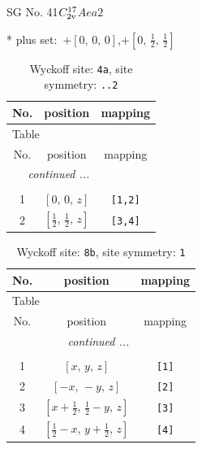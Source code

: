 \documentclass[fleqn,8pt]{jsarticle}
\begin{document}
\setcounter{MaxMatrixCols}{32}

\renewcommand{\tablename}{Table~}
\renewcommand{\figurename}{Figure~}
\begin{center}
\LARGE
SG No. 41\quad$C_{\rm 2v}^{17}$\quad$Aea2$\quad[ orthorhombic ]
\end{center}
* plus set:\,\,\,$+\left[ 0,\, 0,\, 0 \right]$,\quad $+\left[ 0,\, \frac{1}{2},\, \frac{1}{2} \right]$
\renewcommand{\arraystretch}{1.2}
\begin{longtable}{ccc}
\caption{Wyckoff site: {\tt 4a}, site symmetry: {\tt ..2}}
 \\
 \hline \hline
No. & position & mapping \\ \hline \endfirsthead

\multicolumn{2}{l}{\tablename\ \thetable{}} \\
 \hline \hline
No. & position & mapping \\ \hline \endhead

 \hline \hline
\multicolumn{2}{r}{\footnotesize\it continued ...} \\ \endfoot

 \hline \hline
\multicolumn{2}{r}{} \\ \endlastfoot

1 & $\left[ 0,\, 0,\, z \right]$ & {\tt [1,2]} \\ \hline
2 & $\left[ \frac{1}{2},\, \frac{1}{2},\, z \right]$ & {\tt [3,4]} \\
\end{longtable}
\renewcommand{\arraystretch}{1.2}
\begin{longtable}{ccc}
\caption{Wyckoff site: {\tt 8b}, site symmetry: {\tt 1}}
 \\
 \hline \hline
No. & position & mapping \\ \hline \endfirsthead

\multicolumn{2}{l}{\tablename\ \thetable{}} \\
 \hline \hline
No. & position & mapping \\ \hline \endhead

 \hline \hline
\multicolumn{2}{r}{\footnotesize\it continued ...} \\ \endfoot

 \hline \hline
\multicolumn{2}{r}{} \\ \endlastfoot

1 & $\left[ x,\, y,\, z \right]$ & {\tt [1]} \\ \hline
2 & $\left[ - x,\, - y,\, z \right]$ & {\tt [2]} \\ \hline
3 & $\left[ x + \frac{1}{2},\, \frac{1}{2} - y,\, z \right]$ & {\tt [3]} \\ \hline
4 & $\left[ \frac{1}{2} - x,\, y + \frac{1}{2},\, z \right]$ & {\tt [4]} \\
\end{longtable}
\end{document}
